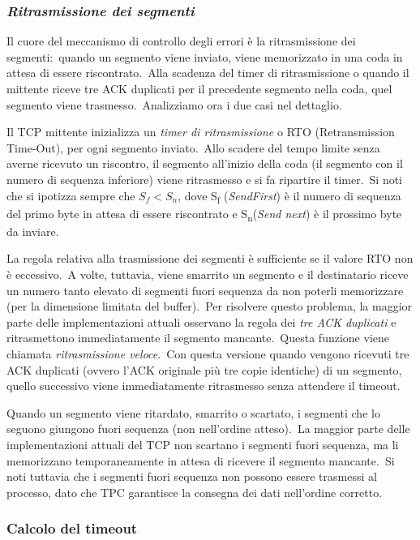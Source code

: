 \subsubsection{\emph{Ritrasmissione dei segmenti}}

Il cuore del meccanismo di controllo degli errori è la ritrasmissione dei segmenti:\ quando un segmento viene inviato, viene memorizzato in una coda in attesa di essere riscontrato.\
Alla scadenza del timer di ritrasmissione o quando il mittente riceve tre ACK duplicati per il precedente segmento nella coda, quel segmento viene trasmesso.\
Analizziamo ora i due casi nel dettaglio.\

Il TCP mittente inizializza un \emph{timer di ritrasmissione} o RTO (Retransmission Time-Out), per ogni segmento inviato.\
Allo scadere del tempo limite senza averne ricevuto un riscontro, il segmento all'inizio della coda (il segmento con il numero di sequenza inferiore) viene ritrasmesso e si fa ripartire il timer.\
Si noti che si ipotizza sempre che $S_f<S_n$, dove S\textsubscript{f} (\emph{SendFirst}) è il numero di sequenza del primo byte in attesa di essere riscontrato e S\textsubscript{n}(\emph{Send next}) è il prossimo byte da inviare.

La regola relativa alla trasmissione dei segmenti è sufficiente se il valore RTO non è eccessivo.\
A volte, tuttavia, viene smarrito un segmento e il destinatario riceve un numero tanto elevato di segmenti fuori sequenza da non poterli memorizzare (per la dimensione limitata del buffer).\
Per risolvere questo problema, la maggior parte delle implementazioni attuali osservano la regola dei \emph{tre ACK duplicati} e ritrasmettono immediatamente il segmento mancante.\
Questa funzione viene chiamata \emph{ritrasmissione veloce}.\
Con questa versione quando vengono ricevuti tre ACK duplicati (ovvero l'ACK originale più tre copie identiche) di un segmento, quello successivo viene immediatamente ritrasmesso senza attendere il timeout.

Quando un segmento viene ritardato, smarrito o scartato, i segmenti che lo seguono giungono fuori sequenza (non nell'ordine atteso).\
La maggior parte delle implementazioni attuali del TCP non scartano i segmenti fuori sequenza, ma li memorizzano temporaneamente in attesa di ricevere il segmento mancante.\
Si noti tuttavia che i segmenti fuori sequenza non possono essere trasmessi al processo, dato che TPC garantisce la consegna dei dati nell'ordine corretto.

\subsubsection{Calcolo del timeout}

